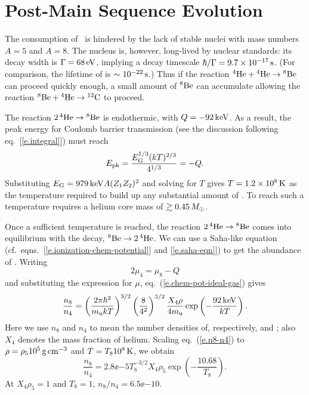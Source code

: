 \chapter{Post-Main Sequence Evolution}

The consumption of \helium\ is hindered by the lack of stable nuclei with mass numbers $A=5$ and $A=8$.  
The nucleus \beryllium[8] is, however, long-lived by nuclear standards: its decay width is $\Gamma = 68\nsp\eV$, implying a decay timescale $\hbar/\Gamma = 9.7\ee{-17}\nsp\second$.  (For comparison, the lifetime of \lithium[5] is $\sim 10^{-22}\nsp\second$.)  Thus if the reaction $\helium[4]+\helium[4]\to\beryllium[8]$ can proceed quickly enough, a small amount of $\beryllium[8]$ can accumulate allowing the reaction $\beryllium[8]+\helium\to\carbon$ to proceed.

The reaction $2\nsp\helium\to\beryllium[8]$ is endothermic, with $Q = -92\nsp\keV$.  As a result, the peak energy for Coulomb barrier transmission (see the discussion following eq.~[\ref{e.integral}]) must reach
\[ \Epk = \frac{\EG^{1/3}(kT)^{2/3}}{4^{1/3}} = -Q. \]
Substituting $\EG = 979\nsp\keV A (Z_{1}Z_{2})^{2}$ and solving for $T$ gives $T = 1.2\ee{8}\nsp\K$ as the temperature required to build up any substantial amount of \beryllium[8].  To reach such a temperature requires a helium core mass of $\gtrsim 0.45\nsp\Msun$.

Once a sufficient temperature is reached, the reaction $2\nsp\helium[4]\to\beryllium[8]$ comes into equilibrium with the decay, $\beryllium[8]\to2\nsp\helium$.  We can use a Saha-like equation (cf.\ eqns.~[\ref{e.ionization-chem-potential}] and [\ref{e.saha-eqn}]) to get the abundance of \beryllium[8].  Writing
\[ 2\mu_{4} = \mu_{8} - Q \]
and substituting the expression for $\mu$, eq.~(\ref{e.chem-pot-ideal-gas}) gives
\begin{equation}\label{e.n8-n4}
\frac{n_{8}}{n_{4}} = \left(\frac{2\pi\hbar^{2}}{\mb kT}\right)^{3/2}\left(\frac{8}{4^{2}}\right)^{3/2}\frac{X_{4}\rho}{4\mb}\exp\left(-\frac{92\nsp\keV}{kT}\right).
\end{equation}
Here we use $n_{8}$ and $n_{4}$ to mean the number densities of, respectively, \beryllium[8] and \helium; also $X_{4}$ denotes the mass fraction of helium.
Scaling eq.~(\ref{e.n8-n4}) to $\rho = \rho_{5} 10^{5}\nsp\grampercc$ and $T = T_{8}10^{8}\nsp\K$, we obtain
\begin{equation}\label{e.n8-to-n4}
 \frac{n_{8}}{n_{4}} = 2.8\ee{-5} T_{8}^{-3/2}X_{4}\rho_{5}\exp\left(-\frac{10.68}{T_{8}}\right).
\end{equation}
At $X_{4}\rho_{5}=1$ and $T_{8} = 1$, $n_{8}/n_{4} = 6.5\ee{-10}$.  

